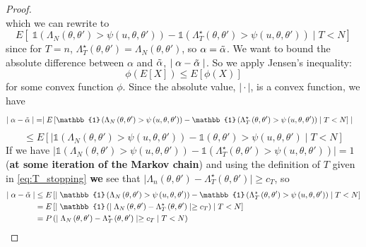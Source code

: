 {\begin{proof}
\begin{equation*}
\end{equation*}
which we can rewrite to
\begin{equation*}
    E\left[\; \mathbb{1}\left(\Lambda_N\left(\theta, \theta'\right) > \psi\left(u, \theta, \theta'\right)\right) - \mathbb{1}\left(\Lambda_T^{\star}\left(\theta,\theta'\right) > \psi\left(u, \theta, \theta'\right)\right)\mid T < N \right] 
\end{equation*}
since for $T = n$, $\Lambda_T^{\star}\left(\theta, \theta'\right) = \Lambda_N\left(\theta, \theta'\right)$, so  $\alpha = \Tilde{\alpha}$. We want to bound the absolute difference between $\alpha$ and $\Tilde{\alpha}$, $\mid \alpha - \Tilde{\alpha}\mid$. So we apply Jensen's inequality: 
\begin{equation}\label{eq:jensen}
\phi\left(E\left[X\right] \right) \leq E\left[\phi\left(X\right)\right] 
\end{equation}
for some convex function $\phi$. Since the absolute value, $\mid \cdot\mid$, is a convex function, we have  
\begin{equation*}
\begin{split}
\mid \alpha - \Tilde{\alpha}\mid &= 
    \mid E\left[\mathbb{1}\left(\Lambda_N\left(\theta, \theta'\right) > \psi \left(u, \theta, \theta'\right)\right) - \mathbb{1}\left(\Lambda_T^{\star}\left(\theta, \theta'\right) > \psi\left(u, \theta, \theta'\right)\right)\mid T < N\right]\mid 
    \end{split}
\end{equation*}
\begin{equation*}
    \leq E\left[\mid \mathbb{1}\left(\Lambda_N\left(\theta, \theta'\right) > \psi\left(u, \theta, \theta'\right)\right) - \mathbb{1}\left(\theta, \theta'\right) > \psi\left(u, \theta, \theta'\right)\mid T<  N\right]
\end{equation*}
If we have $\mid \mathbb{1}\left(\Lambda_N\left(\theta, \theta'\right) > \psi\left(u, \theta, \theta'\right)\right) - \mathbb{1}\left(\Lambda_T^{\star}\left(\theta, \theta'\right) > \psi\left(u, \theta, \theta'\right)\right)\mid = 1$ (\textbf{at some iteration of the Markov chain}) and using the definition of $T$ given in \eqref{eq:T_stopping} \textbf{we} see that $\mid \Lambda_n\left(\theta, \theta'\right) - \Lambda_T^{\star}\left(\theta, \theta'\right) \mid \geq c_T$, so
\begin{equation*}
\begin{split}
\mid \alpha - \Tilde{\alpha}\mid &\leq
     E\left[\mid\mathbb{1}\left(\Lambda_N\left(\theta, \theta'\right)> \psi\left(u, \theta, \theta'\right)\right) -\mathbb{1}\left( \Lambda_T^{\star}\left(\theta, \theta'\right)>\psi\left(u, \theta, \theta'\right)\right)\mid T<N \right] \\ &= E\left[\mid \mathbb{1}\left(\mid \Lambda_N\left(\theta, \theta'\right) - \Lambda_T^{\star}\left(\theta, \theta'\right)\mid \geq c_T\right)\mid T<N\right]\\ &= P\left(\mid\Lambda_N\left(\theta, \theta'\right) - \Lambda_T^{\star}\left(\theta, \theta'\right)\mid \geq c_T \mid T < N \right) \\

\end{split}
\end{equation*}
\end{proof}}
